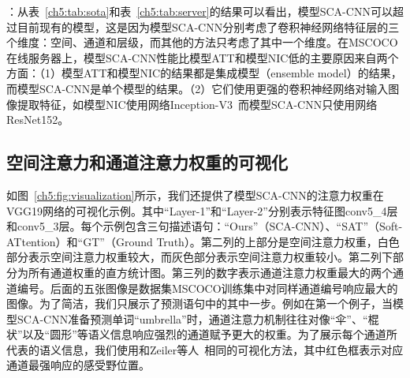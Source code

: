 \begin{table}[t]
\centering
{}
\caption{不同图像描述语句生成算法在数据集MSCOCO的在线服务器上的性能对比} 
\label{ch5:tab:server}
\end{table}

\textbf{}：从表~\ref{ch5:tab:sota}和表~\ref{ch5:tab:server}的结果可以看出，模型SCA-CNN可以超过目前现有的模型，这是因为模型SCA-CNN分别考虑了卷积神经网络特征层的三个维度：空间、通道和层级，而其他的方法只考虑了其中一个维度。在MSCOCO在线服务器上，模型SCA-CNN性能比模型ATT和模型NIC低的主要原因来自两个方面：（1）模型ATT和模型NIC的结果都是集成模型（ensemble model）的结果，而模型SCA-CNN是单个模型的结果。（2）它们使用更强的卷积神经网络对输入图像提取特征，如模型NIC使用网络Inception-V3~\cite{szegedy2016rethinking}而模型SCA-CNN只使用网络ResNet152。


\subsection{空间注意力和通道注意力权重的可视化}
如图~\ref{ch5:fig:visualization}所示，我们还提供了模型SCA-CNN的注意力权重在VGG19网络的可视化示例。其中“Layer-1”和“Layer-2”分别表示特征图conv5\_4层和conv5\_3层。每个示例包含三句描述语句：“Ours”（SCA-CNN）、“SAT”（Soft-ATtention）和“GT”（Ground Truth）。第二列的上部分是空间注意力权重，白色部分表示空间注意力权重较大，而灰色部分表示空间注意力权重较小。第二列下部分为所有通道权重的直方统计图。第三列的数字表示通道注意力权重最大的两个通道编号。后面的五张图像是数据集MSCOCO训练集中对同样通道编号响应最大的图像。为了简洁，我们只展示了预测语句中的其中一步。例如在第一个例子，当模型SCA-CNN准备预测单词“umbrella”时，通道注意力机制往往对像“伞”、“棍状”以及“圆形”等语义信息响应强烈的通道赋予更大的权重。为了展示每个通道所代表的语义信息，我们使用和Zeiler等人~\cite{zeiler2014visualizing}相同的可视化方法，其中红色框表示对应通道最强响应的感受野位置。


